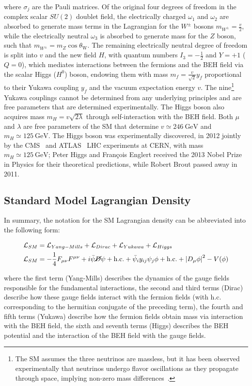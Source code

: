 where $\sigma_j$ are the Pauli matrices.
Of the original four degrees of freedom in the complex scalar $SU(2)$ doublet field, the electrically charged $\omega_1$ and $\omega_2$ are absorbed to generate mass terms in the Lagrangian for the $W^\pm$ bosons $m_{W^\pm} = \frac{v}{2}$, while the electrically neutral $\omega_3$ is absorbed to generate mass for the $Z$ boson, such that $m_{W^\pm} = m_Z \cos \theta_{\mathrm{W}}$.
The remaining electrically neutral degree of freedom is split into $v$ and the new field $H$, with quantum numbers $I_3 = -\frac{1}{2}$ and $Y = +1$ ($Q = 0$), which mediates interactions between the fermions and the BEH field via the scalar Higgs ($H^0$) boson, endowing them with mass $m_f = \frac{v}{\sqrt{2}} y_f$ proportional to their Yukawa coupling $y_f$ and the vacuum expectation energy $v$.
The nine\footnote{The SM assumes the three neutrinos are massless, but it has been observed experimentally that neutrinos undergo flavor oscillations as they propagate through space, implying non-zero mass differences~\cite{PhysRevLett.81.1562}.} Yukawa couplings cannot be determined from any underlying principles and are free parameters that are determined experimentally.
The Higgs boson also acquires mass $m_H = v \sqrt{2 \lambda}$ through self-interaction with the BEH field.
Both $\mu$ and $\lambda$ are free parameters of the SM that determine $v \simeq \SI{246}{\GeV}$ and $m_H \simeq \SI{125}{\GeV}$.
The Higgs boson was experimentally discovered, in 2012 jointly by the CMS~\cite{201230} and ATLAS~\cite{20121} LHC experiments at CERN, with mass $m_H \simeq \SI{125}{\GeV}$; Peter Higgs and François Englert received the 2013 Nobel Prize in Physics for their theoretical predictions, while Robert Brout passed away in 2011.

\subsection{Standard Model Lagrangian Density}
In summary, the notation for the SM Lagrangian density can be abbreviated into the following form:
\begin{linenomath*}
\begin{align}
\mathcal{L}_{SM} &= \mathcal{L}_{Yang-Mills} + \mathcal{L}_{Dirac} + \mathcal{L}_{Yukawa} + \mathcal{L}_{Higgs} \\
\mathcal{L}_{SM} &= -\frac{1}{4} F_{\mu \nu} F^{\mu \nu} + i\bar{\psi} \cancel{D} \psi+\text {h.c.} + \bar{\psi}_i y_{i j} \psi_j \phi+\text {h.c.} + \left \vert D_\mu \phi\right \vert^2 - V(\phi)
\end{align}
\end{linenomath*}
where the first term (Yang-Mills) describes the dynamics of the gauge fields responsible for the fundamental interactions, the second and third terms (Dirac) describe how these gauge fields interact with the fermion fields (with h.c. corresponding to the hermitian conjugate of the preceding term), the fourth and fifth terms (Yukawa) describe how the fermion fields obtain mass via interaction with the BEH field, the sixth and seventh terms (Higgs) describes the BEH potential and the interaction of the BEH field with the gauge fields.

